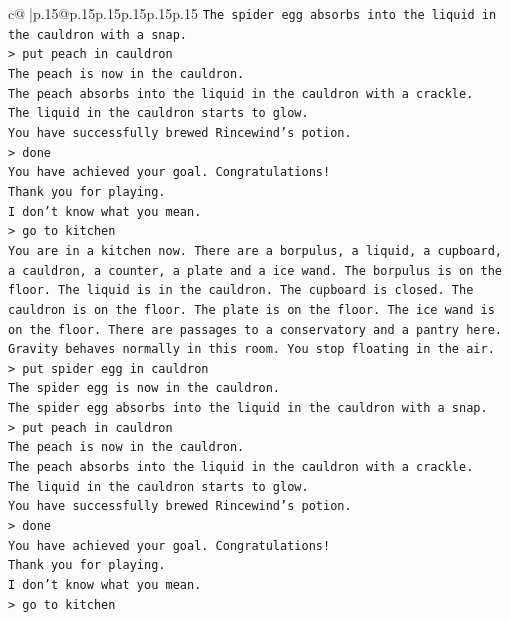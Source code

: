 \documentclass{article}
\begin{document}
{\begin{supertabular}{c@{$\;$}|p{.15\linewidth}@{}p{.15\linewidth}p{.15\linewidth}p{.15\linewidth}p{.15\linewidth}p{.15\linewidth}}
{{{\texttt{The spider egg absorbs into the liquid in the cauldron with a snap.} \\
\texttt{> put peach in cauldron} \\
\texttt{The peach is now in the cauldron.} \\
\texttt{The peach absorbs into the liquid in the cauldron with a crackle.} \\
\texttt{The liquid in the cauldron starts to glow.} \\
\texttt{You have successfully brewed Rincewind's potion.} \\
\texttt{> done} \\
\texttt{You have achieved your goal. Congratulations!} \\
\texttt{Thank you for playing.} \\
\texttt{I don't know what you mean.} \\
\texttt{> go to kitchen} \\
\texttt{You are in a kitchen now. There are a borpulus, a liquid, a cupboard, a cauldron, a counter, a plate and a ice wand. The borpulus is on the floor. The liquid is in the cauldron. The cupboard is closed. The cauldron is on the floor. The plate is on the floor. The ice wand is on the floor. There are passages to a conservatory and a pantry here.} \\
\texttt{Gravity behaves normally in this room. You stop floating in the air.} \\
\texttt{> put spider egg in cauldron} \\
\texttt{The spider egg is now in the cauldron.} \\
\texttt{The spider egg absorbs into the liquid in the cauldron with a snap.} \\
\texttt{> put peach in cauldron} \\
\texttt{The peach is now in the cauldron.} \\
\texttt{The peach absorbs into the liquid in the cauldron with a crackle.} \\
\texttt{The liquid in the cauldron starts to glow.} \\
\texttt{You have successfully brewed Rincewind's potion.} \\
\texttt{> done} \\
\texttt{You have achieved your goal. Congratulations!} \\
\texttt{Thank you for playing.} \\
\texttt{I don't know what you mean.} \\
\texttt{> go to kitchen} \\
}}}
\end{supertabular}}
\end{document}
